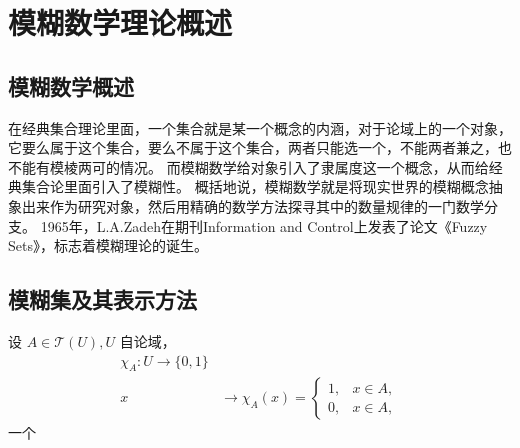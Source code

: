 \chapter[模糊数学理论]{模糊数学理论概述}
\section{模糊数学概述}
\par
在经典集合理论里面，一个集合就是某一个概念的内涵，对于论域上的一个对象，它要么属于这个集合，要么不属于这个集合，两者只能选一个，不能两者兼之，也不能有模棱两可的情况。
而模糊数学给对象引入了隶属度这一个概念，从而给经典集合论里面引入了模糊性。
概括地说，模糊数学就是将现实世界的模糊概念抽象出来作为研究对象，然后用精确的数学方法探寻其中的数量规律的一门数学分支。
1965年，L.A.Zadeh在期刊Information and Control上发表了论文《Fuzzy Sets》，标志着模糊理论的诞生。

\section{模糊集及其表示方法}
\begin{definition}[集合]
设 $A \in \mathscr{T}(U), U$ 自论域，
\[
\begin{aligned}
\chi_{A}: U \rightarrow\{0,1\} \\
x & \rightarrow \chi_{A}(x)=\left\{\begin{array}{ll}
1, & x \in A, \\
0, & x \in A,
\end{array}\right.
\end{aligned}
\]
一个
\end{definition} 